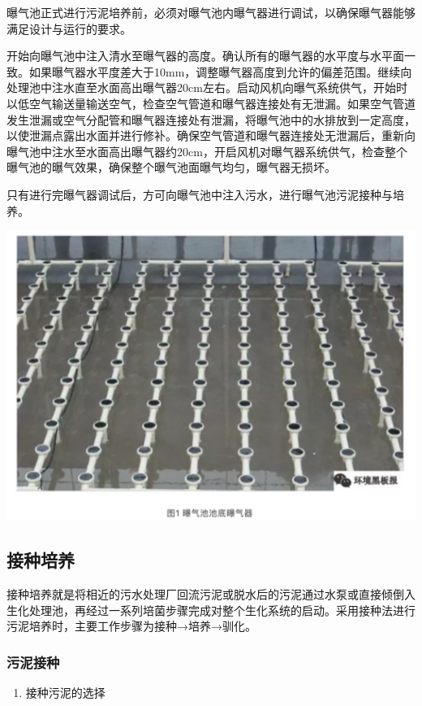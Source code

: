 \documentclass[]{book}
\providecommand{\tightlist}{%
  \setlength{\itemsep}{0pt}\setlength{\parskip}{0pt}}
\begin{document}
曝气池正式进行污泥培养前，必须对曝气池内曝气器进行调试，以确保曝气器能够满足设计与运行的要求。

开始向曝气池中注入清水至曝气器的高度。确认所有的曝气器的水平度与水平面一致。如果曝气器水平度差大于10mm，调整曝气器高度到允许的偏差范围。继续向处理池中注水直至水面高出曝气器20cm左右。启动风机向曝气系统供气，开始时以低空气输送量输送空气，检查空气管道和曝气器连接处有无泄漏。如果空气管道发生泄漏或空气分配管和曝气器连接处有泄漏，将曝气池中的水排放到一定高度，以使泄漏点露出水面并进行修补。确保空气管道和曝气器连接处无泄漏后，重新向曝气池中注水至水面高出曝气器约20cm，开启风机对曝气器系统供气，检查整个曝气池的曝气效果，确保整个曝气池面曝气均匀，曝气器无损坏。

只有进行完曝气器调试后，方可向曝气池中注入污水，进行曝气池污泥接种与培养。

\includegraphics[width=6.67in]{images/ao1}

\subsection{接种培养}

接种培养就是将相近的污水处理厂回流污泥或脱水后的污泥通过水泵或直接倾倒入生化处理池，再经过一系列培菌步骤完成对整个生化系统的启动。采用接种法进行污泥培养时，主要工作步骤为接种→培养→驯化。

\subsubsection{污泥接种}

\begin{enumerate}
\def\labelenumi{\arabic{enumi}.}
\tightlist
\item
  接种污泥的选择
\end{enumerate}
\end{document}
